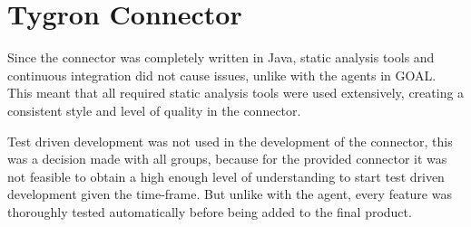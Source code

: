 \section{Tygron Connector}
\label{sec:Tygron Connector}

Since the connector was completely written in Java, static analysis tools and continuous integration did not cause issues, unlike with the agents in GOAL. This meant that all required static analysis tools were used extensively, creating a consistent style and level of quality in the connector.

Test driven development was not used in the development of the connector, this was a decision made with all groups, because for the provided connector it was not feasible to obtain a high enough level of understanding to start test driven development given the time-frame. But unlike with the agent, every feature was thoroughly tested automatically before being added to the final product.
